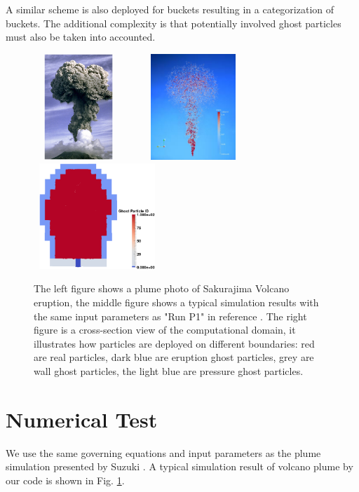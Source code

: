 \documentclass[procedia]{easychair}
\begin{document}
A similar scheme is also deployed for buckets resulting in a categorization of buckets. The additional complexity is that potentially involved ghost particles must also be taken into accounted.
\begin{figure}[!t]
\centering
\includegraphics[width=3.4cm,height=4.0cm]{plume_photo}
\hfil
\includegraphics[width=5.0cm,height=4.0cm]{Plume_simulation}
\hfil
\includegraphics[width=4.8cm,height=4.0cm]{Boundary_condition}
\caption{The left figure shows a plume photo of Sakurajima Volcano eruption, the middle figure shows a typical simulation results with the same input parameters as "Run P1" in reference \cite{suzuki2005numerical}. The right figure is a cross-section view of the computational domain, it illustrates how particles are deployed on different boundaries: red are real particles, dark blue are eruption ghost particles, grey are wall ghost particles, the light blue are pressure ghost particles.}
\label{fig:Plume}
\end{figure}
\section{Numerical Test}
We use the same governing equations and input parameters as the plume simulation presented by Suzuki \cite{suzuki2005numerical}. %
A typical simulation result of volcano plume by our code is shown in Fig. \ref{fig:Plume}.
%
\end{document}

